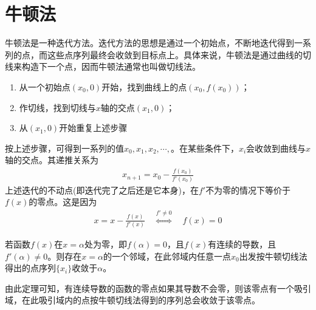 \section{牛顿法}
\label{sec:Newton-method}

牛顿法是一种迭代方法。迭代方法的思想是通过一个初始点，不断地迭代得到一系列的点，而这些点序列最终会收敛到目标点上。具体来说，牛顿法是通过曲线的切线来构造下一个点，因而牛顿法通常也叫做切线法。

\begin{enumerate}
\item 从一个初始点$(x_0, 0)$开始，找到曲线上的点$(x_0, f(x_0))$；
\item 作切线，找到切线与$x$轴的交点$(x_1,0)$；
\item 从$(x_1,0)$开始重复上述步骤
\end{enumerate}

按上述步骤，可得到一系列的值$x_0, x_1, x_2, \cdots, $。在某些条件下，$x_i$会收敛到曲线与$x$轴的交点。其递推关系为
\begin{align*}
  x_{n+1}=x_0 - \frac{f(x_0)}{f'(x_0)}
\end{align*}
上述迭代的不动点(即迭代完了之后还是它本身)，在$f'$不为零的情况下等价于$f(x)$的零点。这是因为
\begin{align*}
  x=x-\frac{f(x)}{f'(x)} \quad \overset{f'\ne0}{\iff}\quad f(x)=0
\end{align*}

\begin{theorem}
  若函数$f(x)$在$x=\alpha$处为零，即$f(\alpha)=0$，且$f(x)$有连续的导数，且$f'(\alpha)\ne0$。则存在$x=\alpha$的一个邻域，在此邻域内任意一点$x_0$出发按牛顿切线法得出的点序列$\{x_i\}$收敛于$\alpha$。
\end{theorem}
由此定理可知，有连续导数的函数的零点如果其导数不会零，则该零点有一个吸引域，在此吸引域内的点按牛顿切线法得到的序列总会收敛于该零点。


